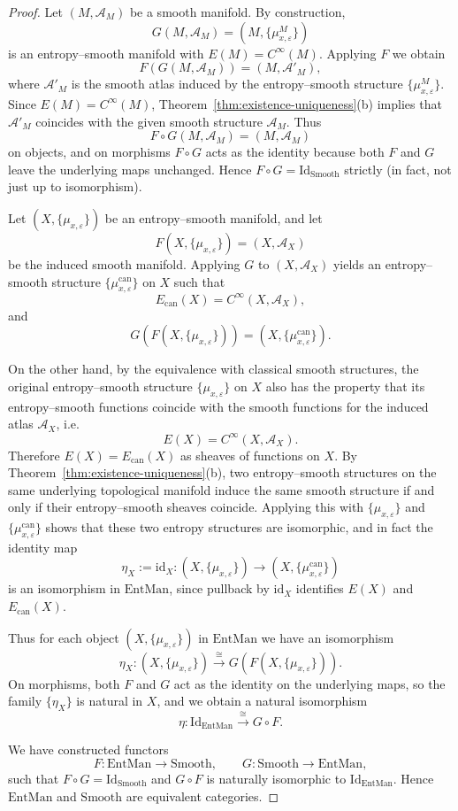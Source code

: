 \documentclass[11pt]{amsart}
\theoremstyle{definition}
\theoremstyle{remark}
\begin{document}
\begin{proof}
Let $(M,\mathcal{A}_M)$ be a smooth manifold. By construction,
\[
G(M,\mathcal{A}_M) = (M,\{\mu^{M}_{x,\varepsilon}\})
\]
is an entropy--smooth manifold with $E(M)=C^\infty(M)$. Applying $F$ we obtain
\[
F(G(M,\mathcal{A}_M)) = (M,\mathcal{A}'_M),
\]
where $\mathcal{A}'_M$ is the smooth atlas induced by the entropy--smooth structure
$\{\mu^{M}_{x,\varepsilon}\}$. Since $E(M)=C^\infty(M)$, Theorem~\ref{thm:existence-uniqueness}(b) implies that
$\mathcal{A}'_M$ coincides with the given smooth structure $\mathcal{A}_M$. Thus
\[
F\circ G(M,\mathcal{A}_M) = (M,\mathcal{A}_M)
\]
on objects, and on morphisms $F\circ G$ acts as the identity because both $F$ and $G$
leave the underlying maps unchanged. Hence $F\circ G = \mathrm{Id}_{\mathrm{Smooth}}$
strictly (in fact, not just up to isomorphism).


Let $(X,\{\mu_{x,\varepsilon}\})$ be an entropy--smooth manifold, and let
\[
F(X,\{\mu_{x,\varepsilon}\}) = (X,\mathcal{A}_X)
\]
be the induced smooth manifold. Applying $G$ to $(X,\mathcal{A}_X)$ yields an
entropy--smooth structure $\{\mu^{\mathrm{can}}_{x,\varepsilon}\}$ on $X$ such that
\[
E_{\mathrm{can}}(X) = C^\infty(X,\mathcal{A}_X),
\]
and
\[
G(F(X,\{\mu_{x,\varepsilon}\})) = (X,\{\mu^{\mathrm{can}}_{x,\varepsilon}\}).
\]

On the other hand, by the equivalence with classical smooth structures, the original entropy--smooth structure $\{\mu_{x,\varepsilon}\}$ on $X$
also has the property that its entropy--smooth functions coincide with the smooth
functions for the induced atlas $\mathcal{A}_X$, i.e.
\[
E(X) = C^\infty(X,\mathcal{A}_X).
\]
Therefore $E(X) = E_{\mathrm{can}}(X)$ as sheaves of functions on $X$. By
Theorem~\ref{thm:existence-uniqueness}(b), two entropy--smooth structures on the same underlying topological
manifold induce the same smooth structure if and only if their entropy--smooth sheaves
coincide. Applying this with $\{\mu_{x,\varepsilon}\}$ and $\{\mu^{\mathrm{can}}_{x,\varepsilon}\}$
shows that these two entropy structures are isomorphic, and in fact the identity map
\[
\eta_X := \mathrm{id}_X : (X,\{\mu_{x,\varepsilon}\}) \longrightarrow
(X,\{\mu^{\mathrm{can}}_{x,\varepsilon}\})
\]
is an isomorphism in $\mathrm{EntMan}$, since pullback by $\mathrm{id}_X$ identifies
$E(X)$ and $E_{\mathrm{can}}(X)$.

Thus for each object $(X,\{\mu_{x,\varepsilon}\})$ in $\mathrm{EntMan}$ we have an
isomorphism
\[
\eta_X : (X,\{\mu_{x,\varepsilon}\}) \xrightarrow{\;\cong\;}
G(F(X,\{\mu_{x,\varepsilon}\})).
\]
On morphisms, both $F$ and $G$ act as the identity on the underlying maps, so the family
$\{\eta_X\}$ is natural in $X$, and we obtain a natural isomorphism
\[
\eta : \mathrm{Id}_{\mathrm{EntMan}} \xrightarrow{\;\cong\;} G\circ F.
\]

We have constructed functors
\[
F : \mathrm{EntMan} \longrightarrow \mathrm{Smooth},
\qquad
G : \mathrm{Smooth} \longrightarrow \mathrm{EntMan},
\]
such that $F\circ G = \mathrm{Id}_{\mathrm{Smooth}}$ and $G\circ F$ is naturally
isomorphic to $\mathrm{Id}_{\mathrm{EntMan}}$. Hence $\mathrm{EntMan}$ and
$\mathrm{Smooth}$ are equivalent categories.
\end{proof}
\end{document}
